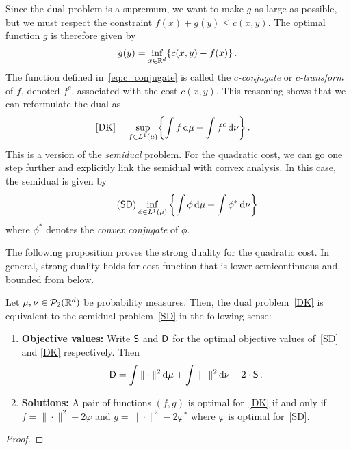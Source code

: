 Since the dual problem is a supremum, we want to make $g$ as large as possible, but we must respect the constraint $f(x) + g(y) \le c(x,y)$.
The optimal function $g$ is therefore given by
\begin{align}\label{eq:c_conjugate}
    g(y) = \inf_{x\in\mathbb{R}^d}\{c(x,y) - f(x)\}\,.
\end{align}
The function defined in~\eqref{eq:c_conjugate} is called the \emph{$c$-conjugate} or \emph{$c$-transform} of $f$, denoted $f^c$, associated with the cost $c(x,y)$.
This reasoning shows that we can reformulate the dual as
\begin{align}
    \eqref{DK}
    &= \sup_{f\in L^1(\mu)}\biggl\{\int f\,\mathrm{d} \mu + \int f^c\,\mathrm{d} \nu\biggr\}\,.\label{eq:general_semidual}
\end{align}
This is a version of the \emph{semidual} problem.
For the quadratic cost, we can go one step further and explicitly link the semidual with convex analysis. In this case, the semidual is given by
\begin{equation}\label{SD}\tag{\textsf{SD}}
       \inf_{{\phi \in L^1(\mu)}} {\biggl\{\int \phi\,\d \mu + \int \phi^* \,\d \nu\biggr\}}
    \end{equation}
where $\phi^*$ denotes the \emph{convex conjugate} of  $\phi$. 


The following proposition proves the strong duality for the quadratic cost.
In general, strong duality holds for cost function that is lower semicontinuous and bounded from below.
\begin{proposition}\label{prop:semidual} 
   Let $\mu,\nu\in \mathcal{P}_2(\mathbb{R}^d)$ be probability measures.
   Then, the dual problem~\eqref{DK} is equivalent to the semidual problem~\eqref{SD} in the following sense:
    \begin{enumerate}
        \item {\bf Objective values:} Write ${\sf S}$ and ${\sf D}$ for the optimal objective values of~\eqref{SD} and \eqref{DK} respectively. Then 
        $$
        {\sf D}= \int\|\cdot\|^2 \, \mathrm{d} \mu + \int \|\cdot\|^2 \, \mathrm{d} \nu - 2\cdot{\sf S}\,.
        $$
        \item {\bf Solutions:} A pair of functions $(f,g)$ is optimal for~\eqref{DK} if and only if $f = \|\cdot\|^2 - 2\varphi$ and $g = \|\cdot\|^2 - 2\varphi^*$ where $\varphi$ is optimal for~\eqref{SD}.
    \end{enumerate}
\end{proposition}
\begin{proof}
    
\end{proof}


